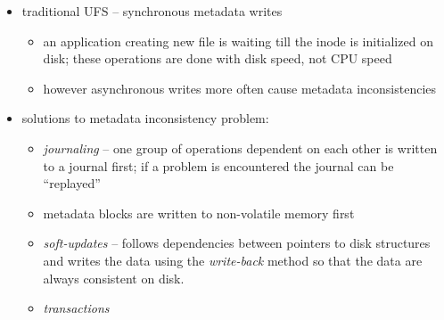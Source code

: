 

\begin{slide}
\setlength{\baselineskip}{0.8\baselineskip}
\begin{itemize}
\setlength{\itemsep}{0ex}
\item traditional UFS -- synchronous metadata writes
    \begin{itemize}
    \setlength{\itemsep}{0ex}
    \item an application creating new file is waiting till the inode is
    initialized on disk; these operations are done with disk speed, not CPU
    speed
    \item however asynchronous writes more often cause metadata inconsistencies
    \end{itemize}
\item solutions to metadata inconsistency problem:
    \begin{itemize}
    \setlength{\itemsep}{0ex}
    \item \emph{journaling} -- one group of operations dependent on each other
    is written to a journal first; if a problem is encountered the journal can
    be ``replayed''
    \item metadata blocks are written to non-volatile memory first
    \item \emph{soft-updates} -- follows dependencies between pointers to disk
    structures and writes the data using the \emph{write-back} method so that
    the data are always consistent on disk.
    \item \emph{transactions}
    \end{itemize}
\end{itemize}
\end{slide}

